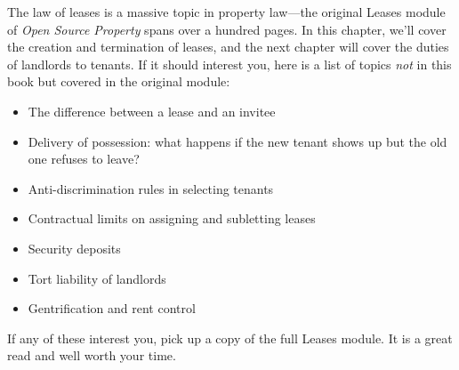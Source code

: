 The law of leases is a massive topic in property law---the original Leases
module of \emph{Open Source Property} spans over a hundred pages. In this
chapter, we'll cover the creation and termination of leases, and the next
chapter will cover the duties of landlords to tenants. If it should interest
you, here is a list of topics \emph{not} in this book but covered in the
original module:
\begin{itemize}
\item The difference between a lease and an invitee
\item Delivery of possession: what happens if the new tenant shows up but the
old one refuses to leave?
\item Anti-discrimination rules in selecting tenants
\item Contractual limits on assigning and subletting leases
\item Security deposits
\item Tort liability of landlords
\item Gentrification and rent control
\end{itemize}
If any of these interest you, pick up a copy of the full Leases module. It is a
great read and well worth your time.
